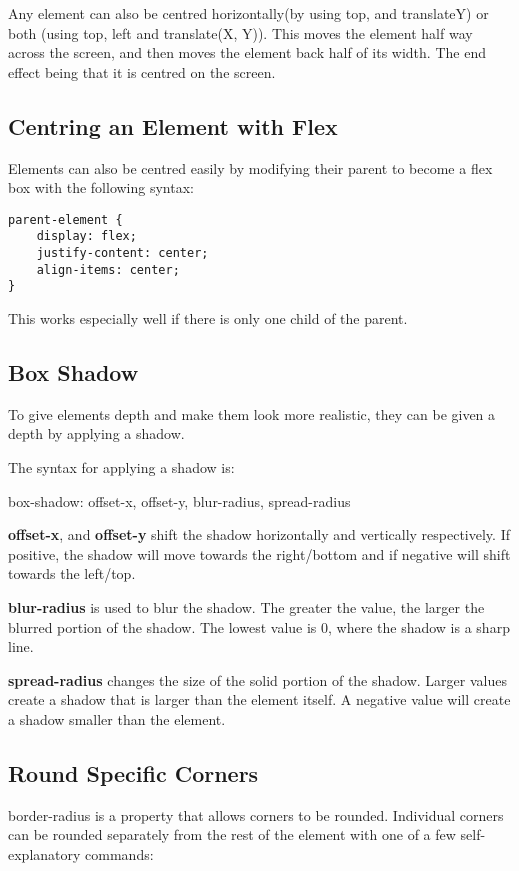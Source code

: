 \documentclass[portfolio.tex]{subfiles}
\begin{document}
				Any element can also be centred horizontally(by using top, and translateY) or both (using top, left and translate(X, Y)). This moves the element half way across the screen, and then moves the element back half of its width.  The end effect being that it is centred on the screen. \autocite{css-centre}

			\subsection{Centring an Element with Flex}
				\label{css-center-element2}
				Elements can also be centred easily by modifying their parent to become a flex box with the following syntax:

				\begin{lstlisting}
parent-element {
	display: flex;
	justify-content: center;
	align-items: center;
}
				\end{lstlisting}

			This works especially well if there is only one child of the parent.

			\subsection{Box Shadow}
				\label{box-shadow}
				To give elements depth and make them look more realistic, they can be given a depth by applying a shadow.

				The syntax for applying a shadow is:

				\begin{center}
					box-shadow: offset-x, offset-y, blur-radius, spread-radius
				\end{center}

				\textbf{offset-x}, and \textbf{offset-y} shift the shadow horizontally and vertically respectively. If positive, the shadow will move towards the right/bottom and if negative will shift towards the left/top.

				\textbf{blur-radius} is used to blur the shadow. The greater the value, the larger the blurred portion of the shadow. The lowest value is 0, where the shadow is a sharp line.

				\textbf{spread-radius} changes the size of the solid portion of the shadow. Larger values create a shadow that is larger than the element itself. A negative value will create a shadow smaller than the element. \autocite{moz-box-shadow}


			\subsection{Round Specific Corners}
				\label{specific-round-corners}
				border-radius is a property that allows corners to be rounded.  Individual corners can be rounded separately from the rest of the element with one of a few self-explanatory commands:\\
\end{document}

